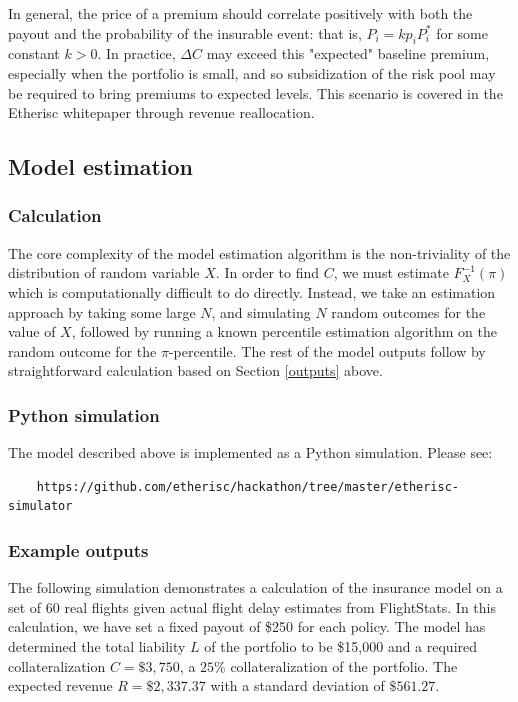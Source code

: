 \documentclass[12pt]{article}
\begin{document}
In general, the price of a premium should correlate positively with both the payout and the probability of the insurable event: that is, $P_i = kp_iP_i^*$ for some constant $k>0$. In practice, $\Delta C$ may exceed this "expected" baseline premium, especially when the portfolio is small, and so subsidization of the risk pool may be required to bring premiums to expected levels. This scenario is covered in the Etherisc whitepaper through revenue reallocation.

\subsection{Model estimation}

\subsubsection{Calculation}

The core complexity of the model estimation algorithm is the non-triviality of the distribution of random variable $X$. In order to find $C$, we must estimate $F_X^{-1}(\pi)$ which is computationally difficult to do directly. Instead, we take an estimation approach by taking some large $N$, and simulating $N$ random outcomes for the value of $X$, followed by running a known percentile estimation algorithm on the random outcome for the $\pi$-percentile. The rest of the model outputs follow by straightforward calculation based on Section \ref{outputs} above.

\subsubsection{Python simulation}

The model described above is implemented as a Python simulation. Please see:
\begin{verbatim}
    https://github.com/etherisc/hackathon/tree/master/etherisc-simulator
\end{verbatim}

\subsubsection{Example outputs}

The following simulation demonstrates a calculation of the insurance model on a set of 60 real flights given actual flight delay estimates from FlightStats. In this calculation, we have set a fixed payout of \$250 for each policy. The model has determined the total liability $L$ of the portfolio to be \$15,000 and a required collateralization $C=\$3,750$, a $25\%$ collateralization of the portfolio. The expected revenue $R=\$2,337.37$ with a standard deviation of $\$561.27$.
\end{document}
